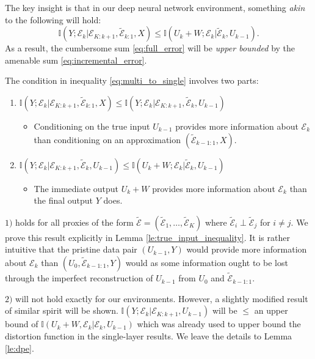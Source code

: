 \documentclass[twoside,11pt]{article}
\def\environment{\mathcal{E}}
\def\proxy{\tilde{\environment}}
\def\I{\mathbb{I}}
\begin{document}
The key insight is that in our deep neural network environment, something \emph{akin} to the following will hold:
\begin{equation}
    \label{eq:multi_to_single}
    \I(Y;\environment_{k}|\environment_{K:k+1}, \proxy_{k:1}, X) \leq \I(U_{k}+W;\environment_k|\proxy_k, U_{k-1}).
\end{equation}
As a result, the cumbersome sum \ref{eq:full_error} will be \emph{upper bounded} by the amenable sum \ref{eq:incremental_error}.

The condition in inequality \ref{eq:multi_to_single} involves two parts:
\begin{enumerate}
    \item $\I(Y;\environment_k|\environment_{K:k+1}, \proxy_{k:1}, X) \leq \I(Y;\environment_k|\environment_{K:k+1}, \proxy_k, U_{k-1})$
    \begin{itemize}
        \item Conditioning on the true input $U_{k-1}$ provides more information about $\environment_k$ than conditioning on an approximation $(\proxy_{k-1:1}, X)$.
    \end{itemize}
    \item $\I(Y;\environment_k|\environment_{K:k+1}, \proxy_k, U_{k-1})\leq \I(U_k+W;\environment_k|\proxy_k, U_{k-1})$
    \begin{itemize}
        \item The immediate output $U_k + W$ provides more information about $\environment_k$ than the final output $Y$ does.
    \end{itemize}
\end{enumerate}

$1)$ holds for all proxies of the form $\proxy = (\proxy_1, \hdots, \proxy_K)$ where $\proxy_i\perp\proxy_j$ for $i\neq j$. We prove this result explicitly in Lemma \ref{le:true_input_inequality}. It is rather intuitive that the pristine data pair $(U_{k-1}, Y)$ would provide more information about $\environment_k$ than $(U_0, \proxy_{k-1:1}, Y)$ would as some information ought to be lost through the imperfect reconstruction of $U_{k-1}$ from $U_0$ and $\proxy_{k-1:1}$.

$2)$ will not hold exactly for our environments. However, a slightly modified result of similar spirit will be shown. $\I(Y;\environment_{k}|\environment_{K:k+1}, U_{k-1})$ will be $\leq$ an upper bound of $\I(U_k+W, \environment_{k}|\environment_{k}, U_{k-1})$ which was already used to upper bound the distortion function in the single-layer results. We leave the details to Lemma \ref{le:dpe}.
\end{document}
